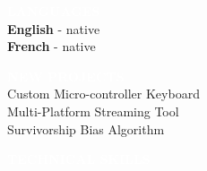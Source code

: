 \documentclass[9pt]{src/developercv} %
\begin{document}
\begin{minipage}[t]{0.3\textwidth}
	\vspace{-\baselineskip}

	\vspace{\baselineskip} %
	\colorbox{cyan700}{\textcolor{white}{\MakeUppercase{\textbf{Languages}}}}\\%
	
	\textbf{English} - native\\
	\textbf{French} - native
\end{minipage}
\hfill
\begin{minipage}[t]{0.3\textwidth}
	\vspace{-\baselineskip}
	
	\vspace{\baselineskip} %
	\colorbox{cyan600}{\textcolor{white}{\MakeUppercase{\textbf{New Projects}}}}\\%
	
	Custom Micro-controller Keyboard\\
	Multi-Platform Streaming Tool\\
	Survivorship Bias Algorithm
\end{minipage}
\hfill
\begin{minipage}[t]{0.3\textwidth}
	\vspace{-\baselineskip}
	
	\vspace{\baselineskip} %
	\colorbox{cyan500}{\textcolor{white}{\MakeUppercase{\textbf{Technical Skills}}}}\\%

\end{minipage}

\end{document}
